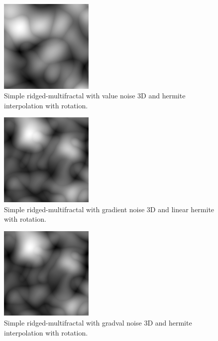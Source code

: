 \begin{figure}[h]
\centering
\includegraphics[width=0.4\textwidth]{out/simpleRidgedMultifractal3/simpleRidgedMultifractal3_value_noise3D_hermiteInterp_rot.png}
\caption{Simple ridged-multifractal with value noise 3D and hermite interpolation with rotation.}
\label{fig:simple_redgedmf3_value_noise3D_hermiteInterp_rot}
\end{figure}

\begin{figure}[h]
\centering
\includegraphics[width=0.4\textwidth]{out/simpleRidgedMultifractal3/simpleRidgedMultifractal3_gradient_noise3D_hermiteInterp_rot.png}
\caption{Simple ridged-multifractal with gradient noise 3D and linear hermite with rotation.}
\label{fig:simple_redgedmf3_gradient_noise3D_hermiteInterp_rot}
\end{figure}

\begin{figure}[h]
\centering
\includegraphics[width=0.4\textwidth]{out/simpleRidgedMultifractal3/simpleRidgedMultifractal3_gradval_noise3D_hermiteInterp_rot.png}
\caption{Simple ridged-multifractal with gradval noise 3D and hermite interpolation with rotation.}
\label{fig:simple_redgedmf3_gradval_noise3D_hermiteInterp_rot}
\end{figure}

